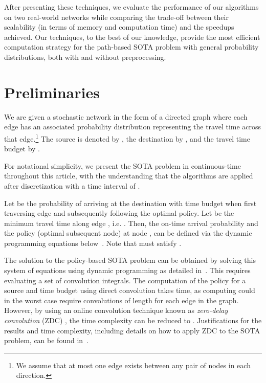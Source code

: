 \documentclass[oribibl]{llncs}
\begin{document}
		After presenting these techniques, we evaluate the performance of our algorithms on two real-world
		networks while comparing the trade-off between their scalability
		(in terms of memory and computation time) and the speedups achieved.
		Our techniques, to the best of our knowledge, provide the most efficient computation strategy for the
		path-based SOTA problem with general probability distributions, both with and without preprocessing.

	\section{Preliminaries}
		We are given a stochastic network in the form of a directed graph 
		where each edge  has an associated probability distribution
		 representing the travel time across that edge.\footnote
		{
			We assume that at most one edge exists between any pair of nodes in each direction.
		}
		The source is denoted by , the destination by ,
		and the travel time budget by .

		For notational simplicity, we present the SOTA problem in continuous-time throughout this article,
		with the understanding that the algorithms are applied after discretization with a
		time interval of .

		\begin{definition}
			Let  be the probability of arriving at the destination 
			with time budget  when first traversing edge 
			and subsequently following the optimal policy.
			Let  be the minimum travel time along edge , i.e. .
			Then, the on-time arrival probability  and the policy (optimal subsequent node)  at node ,
			can be defined via the dynamic programming equations below~\cite{fan2005arriving}.
			Note that  must satisfy .
			\begin{multicols}{2}
				\noindent
				
				
			\end{multicols}
		\end{definition}

		The solution to the policy-based SOTA problem can be obtained by solving this system of equations
		using dynamic programming as detailed in~\cite{samaranayake2012tractable}.
		This requires evaluating a set of convolution integrals. The computation of
		the policy  for a source  and time budget  using direct convolution takes  time,
		as computing  could in the worst case require convolutions of length  for each edge in the graph.
		However, by using an online convolution technique
		known as \textit{zero-delay convolution} (ZDC) \cite{gardner1994efficient, dean2010speeding},
		the time complexity can be reduced to .
		Justifications for the results and time complexity, including details
		on how to apply ZDC to the SOTA problem, can be found in~\cite{samaranayake2012tractable, samaranayake2012speedup}.
\end{document}
